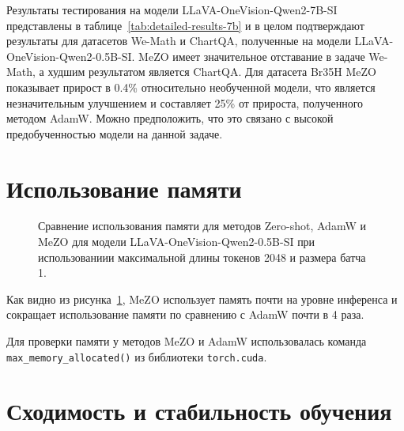 \documentclass[LI,KR]{HSEUniversity}
\begin{document}
Результаты тестирования на модели LLaVA-OneVision-Qwen2-7B-SI представлены в таблице~\ref{tab:detailed-results-7b}
и в целом подтверждают результаты для датасетов We-Math и ChartQA, полученные на модели LLaVA-OneVision-Qwen2-0.5B-SI.
MeZO имеет значительное отставание в задаче We-Math, а худшим результатом является ChartQA.
Для датасета Br35H MeZO показывает прирост в 0.4\% относительно необученной модели, что является незначительным улучшением
и составляет 25\% от прироста, полученного методом AdamW.
Можно предположить, что это связано с высокой предобученностью модели на данной задаче.

\section{Использование памяти}

\begin{figure}[H]
\centering
{}
\caption{Сравнение использования памяти для методов Zero-shot, AdamW и MeZO для модели LLaVA-OneVision-Qwen2-0.5B-SI при использованиии максимальной длины токенов 2048 и размера батча 1.}
\label{fig:memory-usage}
\end{figure}

Как видно из рисунка~\ref{fig:memory-usage}, MeZO использует память почти на уровне инференса и сокращает использование памяти по сравнению с AdamW почти в 4 раза.

Для проверки памяти у методов MeZO и AdamW использовалась команда \texttt{max\_memory\_allocated()} из библиотеки \texttt{torch.cuda}.

\section{Сходимость и стабильность обучения}
\end{document}
